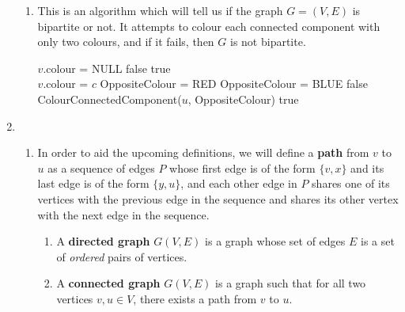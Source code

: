 \documentclass[fleqn]{article}
\begin{document}
\begin{enumerate}
\begin{enumerate}
		\item %
		This is an algorithm which will tell us if the graph \(G = (V, E)\) is bipartite or not. It attempts to colour each connected component with only two colours, and if it fails, then \(G\) is not bipartite.
		\begin{algorithmic}[1]
				 
					\State \(v\).colour = NULL
				\EndFor
					 
							\State \Return false 
						\EndIf
					\EndIf
				\EndFor
				\State \Return true
			\EndFunction
			\\
			\State \(v\).colour = \(c\)
				\State OppositeColour = RED
			\Else
				\State OppositeColour = BLUE
			\EndIf
					 
						\State \Return false 
						\State ColourConnectedComponent(\(u\), OppositeColour) 
					\EndIf
				\EndFor
				\State \Return true
			\EndFunction
		\end{algorithmic}
	\end{enumerate}

	\item %
	\begin{enumerate}
		\item %
		In order to aid the upcoming definitions, we will define a \textbf{path} from \(v\) to \(u\) as a sequence of edges \(P\) whose first edge is of the form \(\{v, x\}\) and its last edge is of the form \(\{y, u\}\), and each other edge in \(P\) shares one of its vertices with the previous edge in the sequence and shares its other vertex with the next edge in the sequence.
		\begin{enumerate}
			\item %
			A \textbf{directed graph} \(G(V, E)\) is a graph whose set of edges \(E\) is a set of \textit{ordered} pairs of vertices.

			\item %
			A \textbf{connected graph} \(G(V, E)\) is a graph such that for all two vertices \(v, u \in V\), there exists a path from \(v\) to \(u\).


\end{enumerate}
\end{enumerate}
\end{enumerate}
\end{document}
